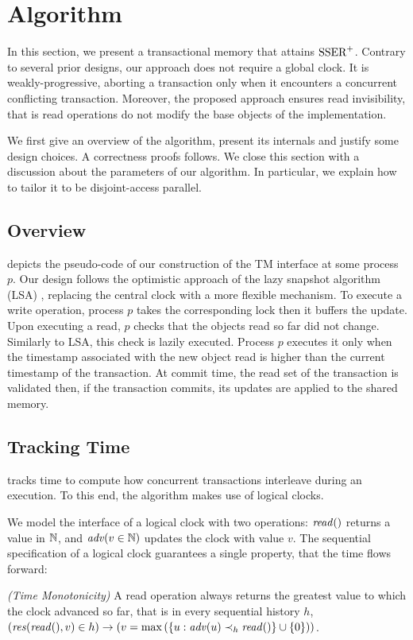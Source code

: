 \section{Algorithm}

In this section, we present a transactional memory that attains $\SPSER$.
Contrary to several prior designs, our approach does not require a global clock.
It is weakly-progressive, aborting a transaction only when it encounters a concurrent conflicting transaction.
Moreover, the proposed approach ensures read invisibility, that is read operations do not modify the base objects of the implementation.

We first give an overview of the algorithm, present its internals and justify some design choices.
A correctness proofs follows.
We close this section with a discussion about the parameters of our algorithm.
In particular, we explain how to tailor it to be disjoint-access parallel.

\subsection{Overview}

 depicts the pseudo-code of our construction of the TM interface at some process $p$.
Our design follows the optimistic approach of the lazy snapshot algorithm (LSA) \cite{FelberFMR10}, replacing the central clock with a more flexible mechanism.
%
To execute a write operation, process $p$ takes the corresponding lock then it buffers the update.
Upon executing a read, $p$ checks that the objects read so far did not change.
Similarly to LSA, this check is lazily executed.
Process $p$ executes it only when the timestamp associated with the new object read is higher than the current timestamp of the transaction.
At commit time, the read set of the transaction is validated then, if the transaction commits, its updates are applied to the shared memory.

\subsection{Tracking Time}

 tracks time to compute how concurrent transactions interleave during an execution.
To this end, the algorithm makes use of logical clocks.

We model the interface of a logical clock with two operations: $\cread$ returns a value in $\naturalSet$, and $\cadv(v \in \naturalSet)$ updates the clock with value $v$.
The sequential specification of a logical clock guarantees a single property, that the time flows forward:
\begin{inparaenum}
\item[\emph{(Time Monotonicity)}]
  A read operation always returns the greatest value to which the clock advanced so far, that is in every sequential history $h$, $(\responseAny{\cread}{v} \in h) \implies (v = \max{(\{u : \cadv(u) \hb_h \cread \} \union \{0\})})$.
\end{inparaenum}

